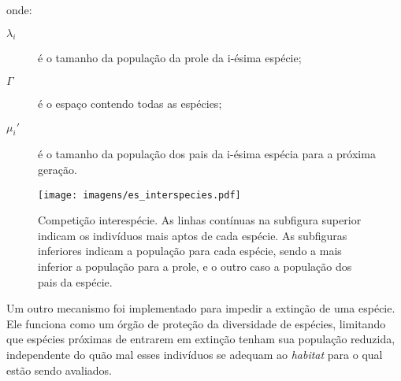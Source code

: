 \noindent onde:

\begin{description}
\item[$\lambda_i$] é o tamanho da população da prole da i-ésima
espécie;
\item[$\Gamma$] é o espaço contendo todas as espécies;
\item[$\mu_{i}'$] é o tamanho da população dos pais da i-ésima espécia
para a próxima geração.
\end{description}


\begin{figure}[h!t]
\centering
\texttt{[image: imagens/es\_interspecies.pdf]}
\caption[Competição interespécie.]{Competição interespécie. As linhas
contínuas na subfigura superior indicam os indivíduos mais aptos de
cada espécie. As subfiguras inferiores indicam a população para cada
espécie, sendo a mais inferior a população para a prole, e o outro
caso a população dos pais da espécie.%
}
\label{fig:interespecies}
\end{figure}

Um outro mecanismo foi implementado para impedir a extinção de uma
espécie. Ele funciona como um órgão de proteção da diversidade de
espécies, limitando que espécies próximas de entrarem em extinção
tenham sua população reduzida, independente do quão mal esses
indivíduos se adequam ao \emph{habitat} para o qual estão sendo
avaliados.

